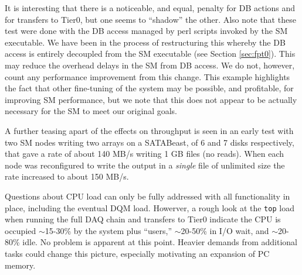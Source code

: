 It is interesting that there is a noticeable, and equal,  penalty for DB actions
and for transfers to Tier0, but one seems to ``shadow'' the other.
Also note that these test were done with the DB access managed by perl scripts invoked
by the SM executable. We have been in the process of restructuring this whereby
the DB access is entirely decoupled from the SM executable (see Section \ref{sec:fpt0}).
This may reduce the overhead delays in the SM from DB access.
We do not, however, count any performance improvement from this change.
This example highlights the fact that other fine-tuning of the system may be possible,
and profitable, for improving SM performance, but we note that this does not appear 
to be actually necessary for the SM to meet our original goals.

A further teasing apart of the effects on throughput is seen in an early
test with two SM nodes writing two arrays on a SATABeast, of 6 and 7 disks respectively,
that gave a rate of about 140 MB/s writing 1 GB files (no reads).
When each node was reconfigured to write the output in a {\it single} file of unlimited
size the rate increased to about  150 MB/s.

Questions about CPU load can only be fully addressed with all functionality
in place, including the eventual DQM load.
Howerver, a rough look at the \verb+top+ load when running the full DAQ chain and
transfers to Tier0 indicate the CPU is occupied $\sim$15-30\% by the system plus ``users,''
$\sim$20-50\% in I/O wait, and $\sim$20-80\% idle.
No problem is apparent at this point.
Heavier demands from additional tasks could change this picture, 
especially motivating an expansion of PC memory.

